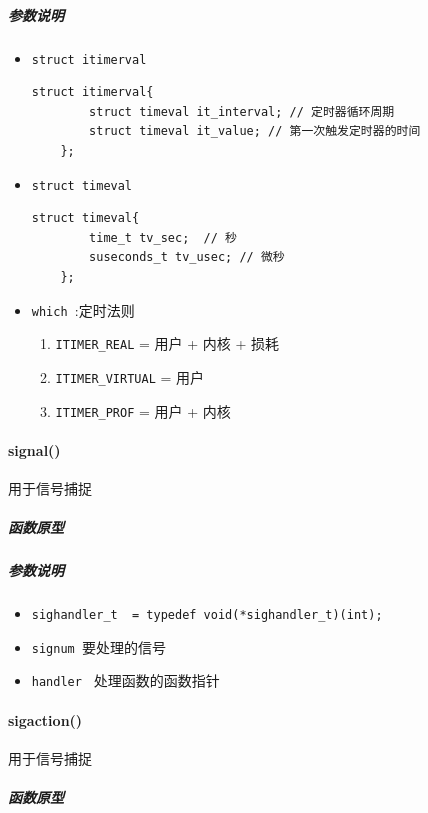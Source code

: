 \documentclass[UTF8,a4paper,12pt]{ctexbook}
\begin{document}
			\subparagraph{参数说明}
				\begin{itemize}[itemindent =1em]
					\item \verb|struct itimerval|
						\begin{lstlisting}[frame = L, xleftmargin = .07\textwidth]
	struct itimerval{
		struct timeval it_interval; // 定时器循环周期
		struct timeval it_value; // 第一次触发定时器的时间
	};
						\end{lstlisting}
					\item \verb|struct timeval|
						\begin{lstlisting}[frame = L, xleftmargin = .07\textwidth]
	struct timeval{
		time_t tv_sec;	// 秒
		suseconds_t tv_usec; // 微秒
	};
						\end{lstlisting}
					\item \verb|which |:定时法则
						\begin{enumerate}[itemindent = 1em]
							\item \verb|ITIMER_REAL| = 用户 + 内核 + 损耗 
							\item \verb|ITIMER_VIRTUAL| = 用户
							\item \verb|ITIMER_PROF| = 用户 + 内核
						\end{enumerate}
				\end{itemize}				
	
		\paragraph{signal()}用于信号捕捉
			\subparagraph{函数原型}	
			
			\subparagraph{参数说明}
				\begin{itemize}[itemindent =1em]
					\item \verb|sighandler_t  = typedef void(*sighandler_t)(int);| 
					\item \verb|signum |要处理的信号
					\item \verb|handler | 处理函数的函数指针
				\end{itemize}	
	
		\paragraph{sigaction()}用于信号捕捉
			\subparagraph{函数原型}	
			
\end{document}
